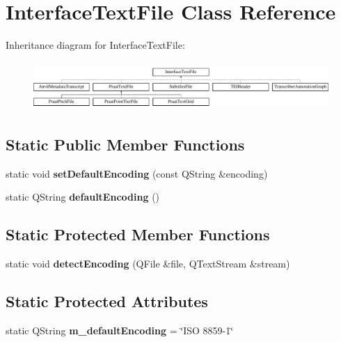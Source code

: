 \hypertarget{class_interface_text_file}{}\section{Interface\+Text\+File Class Reference}
\label{class_interface_text_file}
Inheritance diagram for Interface\+Text\+File\+:\begin{figure}[H]
\begin{center}
\leavevmode
\includegraphics[height=1.856354cm]{class_interface_text_file}
\end{center}
\end{figure}
\subsection*{Static Public Member Functions}
\begin{DoxyCompactItemize}
\item 
\mbox{\label{class_interface_text_file_aae72c50b770e9a39d76191e2c57de6c7}} 
static void {\bfseries set\+Default\+Encoding} (const Q\+String \&encoding)
\item 
\mbox{\label{class_interface_text_file_a0350b78708ea6e1edb4ed9b95d18b18c}} 
static Q\+String {\bfseries default\+Encoding} ()
\end{DoxyCompactItemize}
\subsection*{Static Protected Member Functions}
\begin{DoxyCompactItemize}
\item 
\mbox{\label{class_interface_text_file_a4535a47b064c244f5fc652a6e8506707}} 
static void {\bfseries detect\+Encoding} (Q\+File \&file, Q\+Text\+Stream \&stream)
\end{DoxyCompactItemize}
\subsection*{Static Protected Attributes}
\begin{DoxyCompactItemize}
\item 
\mbox{\label{class_interface_text_file_a9255f267c6c53aa5ac1b02bffbb23b10}} 
static Q\+String {\bfseries m\+\_\+default\+Encoding} = \char`\"{}I\+SO 8859-\/1\char`\"{}
\end{DoxyCompactItemize}


